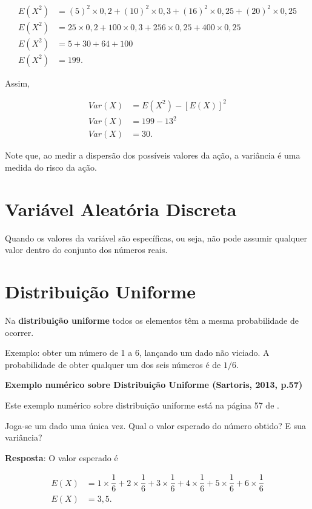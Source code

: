 \documentclass[
]{book}
\begin{document}
\begin{align}
  E(X^2) &= (5)^2 \times 0,2 + (10)^2 \times 0,3 + (16)^2 \times 0,25 + (20)^2 \times 0,25 \\
  E(X^2) &= 25 \times 0,2 + 100 \times 0,3 + 256 \times 0,25 + 400 \times 0,25 \\
  E(X^2) &= 5 + 30 + 64 + 100 \\
  E(X^2) &= 199.
\end{align}

Assim,

\begin{align}
  Var(X) &= E(X^2) - [E(X)]^2\\
  Var(X) &= 199 - 13^2 \\
  Var(X) &= 30.
\end{align}

Note que, ao medir a dispersão dos possíveis valores da ação, a variância é uma medida do risco da ação.

\hypertarget{variuxe1vel-aleatuxf3ria-discreta-1}{%
\section{Variável Aleatória Discreta}\label{variuxe1vel-aleatuxf3ria-discreta-1}}

Quando os valores da variável são específicas, ou seja, não pode assumir qualquer valor dentro do conjunto dos números reais.

\hypertarget{distribuiuxe7uxe3o-uniforme}{%
\section{Distribuição Uniforme}\label{distribuiuxe7uxe3o-uniforme}}

Na \textbf{distribuição uniforme} todos os elementos têm a mesma probabilidade de ocorrer.

Exemplo: obter um número de 1 a 6, lançando um dado não viciado. A probabilidade de obter qualquer um dos seis números é de \(1/6\).

\textbf{Exemplo numérico sobre Distribuição Uniforme (Sartoris, 2013, p.57)}

Este exemplo numérico sobre distribuição uniforme está na página 57 de \citet{Sartoris2013}.

Joga-se um dado uma única vez. Qual o valor esperado do número obtido? E sua variância?

\textbf{Resposta}: O valor esperado é

\begin{align}
  E(X) &= 1 \times \dfrac{1}{6} + 2 \times \dfrac{1}{6} + 3\times \dfrac{1}{6} + 4\times \dfrac{1}{6} + 5\times \dfrac{1}{6} + 6\times \dfrac{1}{6}\\
  E(X) &= 3,5.
\end{align}
\end{document}

